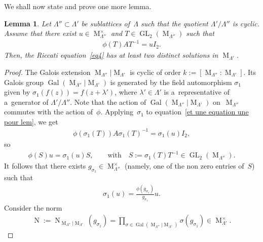 \documentclass[11pt]{article}
\numberwithin{equation}{section}
\newtheorem{Lemma}[Theorem]{Lemma}
\begin{document}
We shall now state and prove one more lemma.

\begin{Lemma}
\label{lem descente}
Let $\Lambda'' \subset \Lambda'$ be sublattices of~$\Lambda$ such that the quotient $\Lambda'/\Lambda''$ is cyclic.
Assume that there exist $u \in \operatorname{M}_{\Lambda''}^{\times}$ and $T \in
\operatorname{GL}_{2}(\operatorname{M}_{\Lambda''})$ such that
\begin{gather}
\label{et une equation une pour lem}
\phi(T)AT^{-1}=u I_{2}.
\end{gather}
Then, the Riccati equation~\eqref{eq4} has at least two distinct solutions in $\operatorname{M}_{\Lambda'}$.
\end{Lemma}

\begin{proof}
The Galois extension $ \operatorname{M}_{\Lambda''} \vert \operatorname{M}_{\Lambda'} $ is cyclic of order
$k:=[\operatorname{M}_{\Lambda''}: \operatorname{M}_{\Lambda'}]$.
Its Galois group $\operatorname{Gal}(\operatorname{M}_{\Lambda''}|\operatorname{M}_{\Lambda'})$ is generated by the
f\/ield automorphism $\sigma_{1}$ given by $\sigma_{1}(f(z))=f(z+\lambda')$, where $\lambda' \in \Lambda'$ is
a~representative of a~generator of $\Lambda'/\Lambda''$.
Note that the action of $\operatorname{Gal}(\operatorname{M}_{\Lambda''}|\operatorname{M}_{\Lambda'})$ on~$\operatorname{M}_{\Lambda''}$ commutes with the action of~$\phi$.
Applying~$\sigma_{1}$ to equation~\eqref{et une equation une pour lem}, we get
\begin{gather*}
\phi(\sigma_{1} (T))A\sigma_{1}(T)^{-1}=\sigma_{1}(u) I_{2},
\end{gather*}
so
\begin{gather*}
\phi(S)u=\sigma_{1}(u) S, \qquad \text{with} \quad S:=\sigma_{1}(T) T^{-1} \in \operatorname{GL}_{2}(\operatorname{M}_{\Lambda''}).
\end{gather*}
It follows that there exists $g_{\sigma_{1}}\in \operatorname{M}_{\Lambda''}^{\times}$ (namely, one of the non zero
entries of~$S$) such that
\begin{gather*}
\sigma_{1}(u)=\frac{\phi (g_{\sigma_{1}})}{g_{\sigma_{1}}}u.
\end{gather*}
Consider the norm
\begin{gather*}
\operatorname{N}:=\operatorname{N}_{\operatorname{M}_{\Lambda''}|\operatorname{M}_{\Lambda'}}(g_{\sigma_1})=
\prod\limits_{\sigma \in \operatorname{Gal}(\operatorname{M}_{\Lambda''}|\operatorname{M}_{\Lambda'})} \sigma
(g_{\sigma_1}) \in \operatorname{M}_{\Lambda'}^{\times}.

\end{gather*}
\end{proof}
\end{document}

